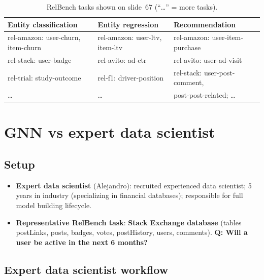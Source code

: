 \begin{table}[htbp]
  \centering\small
  \caption{RelBench tasks shown on slide~67 (``\dots'' = more tasks).}
  \label{tab:lec12-tasks}
  \begin{tabular}{@{}lll@{}}
    \toprule
    Entity classification & Entity regression & Recommendation\\
    \midrule
    rel-amazon: user-churn, item-churn & rel-amazon: user-ltv, item-ltv
      & rel-amazon: user-item-purchase\\
    rel-stack: user-badge & rel-avito: ad-ctr & rel-avito: user-ad-visit\\
    rel-trial: study-outcome & rel-f1: driver-position
      & rel-stack: user-post-comment,\\
    \dots & \dots & \quad post-post-related; \dots\\
    \bottomrule
  \end{tabular}
\end{table}

\section{GNN vs expert data scientist}\label{sec:lec12-expert}

\subsection{Setup}\label{sec:lec12-setup}

\begin{itemize}
  \item \textbf{Expert data scientist} (Alejandro): recruited experienced data scientist;
    5 years in industry (specializing in financial databases); responsible for full model
    building lifecycle.
  \item \textbf{Representative RelBench task}: \textbf{Stack Exchange database} (tables postLinks, posts, badges, votes, postHistory, users,
    comments). \textbf{Q: Will a user be active in the next 6 months?}
\end{itemize}

\subsection{Expert data scientist workflow}\label{sec:lec12-workflow}

